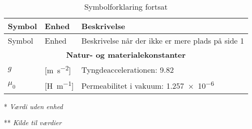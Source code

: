 

\begin{table}[h!]
\centering
\caption{Symbolforklaring fortsat}
\label{tab:symboler2}
\begin{threeparttable}
\begin{tabular}{l l l}
\toprule
\multicolumn{1}{l}{Symbol}       &
\multicolumn{1}{l}{Enhed}        &
\multicolumn{1}{l}{Beskrivelse}  \\ 
\midrule

Symbol & Enhed & Beskrivelse når der ikke er mere plads på side 1 \\

\midrule
\multicolumn{3}{c}{\textbf{Natur- og materialekonstanter\tnote{**}}}       \\
\midrule
$g$         &	[\si{\meter\per\second^2}]		&	Tyngdeaccelerationen: \num{9,82} \\
$\mu_0$		&	[\si{\henry\per\meter}]			&	Permeabilitet i vakuum: \num{1,257e-6} \\
\bottomrule
\end{tabular}
\begin{tablenotes}
\item[*] \textit{Værdi uden enhed}
\item[**] \textit{Kilde til værdier \cite{Halliday2014}}
\end{tablenotes}
\end{threeparttable}
\end{table}
